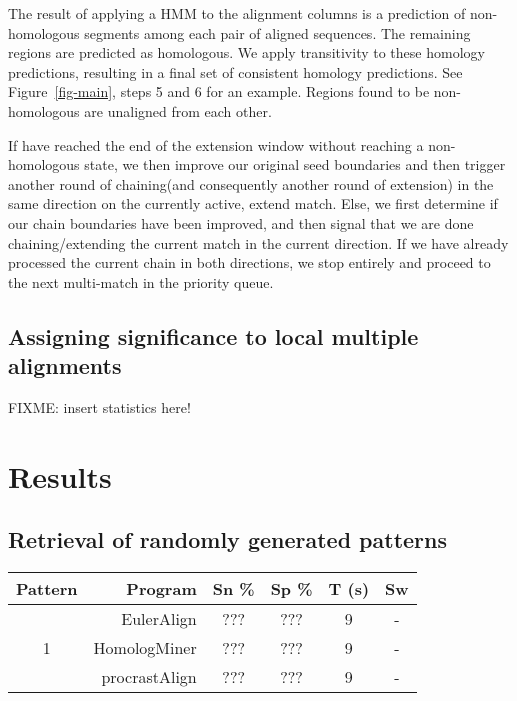\documentclass{ws-procs9x6}
\begin{document}
The result of applying a HMM to the alignment columns is a prediction of non-homologous segments among each pair of aligned sequences.  The remaining regions are predicted as homologous.  We apply transitivity to these homology predictions, resulting in a final set of consistent homology predictions.  See Figure~\ref{fig-main}, steps 5 and 6 for an example. Regions found to be non-homologous are unaligned from each other.

If have reached the end of the extension window without reaching a non-homologous state, we then improve our original seed boundaries and then trigger another round of chaining(and consequently another round of extension) in the same direction on the currently active, extend match. Else, we first determine if our chain boundaries have been improved, and then signal that we are done chaining/extending the current match in the current direction. If we have already processed the current chain in both directions, we stop entirely and proceed to the next multi-match in the priority queue.

\subsection{Assigning significance to local multiple alignments}
FIXME: insert statistics here!



\section{Results}
\subsection{Retrieval of randomly generated patterns}
\begin{table}[b]
\scriptsize
  \centering
\begin{tabular}{|c|rcccc|}
\hline Pattern & Program & Sn \% & Sp \% & T (s) & Sw \\
\hline
    & EulerAlign     &??? & ??? & 9 & - \\
  1 & HomologMiner  &??? & ??? & 9 & - \\
   &  procrastAlign  &??? & ??? & 9 & - \\


\hline
\end{tabular}
%
\end{table}
\end{document}
